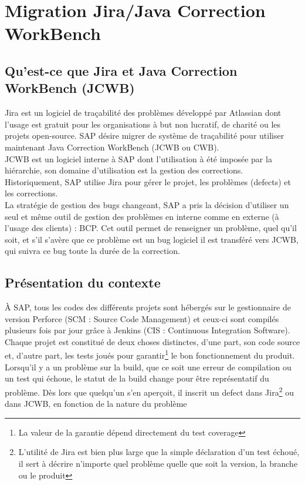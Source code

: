 \chapter{Migration Jira/Java Correction WorkBench}\label{chapitre:migration}

\section{Qu'est-ce que Jira et Java Correction WorkBench (JCWB)}
Jira est un logiciel de tra\c{c}abilit\'{e} des probl\`{e}mes d\'{e}veloppé par Atlassian dont l'usage est gratuit pour les organisations \`{a} but non lucratif, de charit\'{e} ou les projets open-source. SAP désire migrer de système de traçabilité pour utiliser maintenant Java Correction WorkBench (JCWB ou CWB).\\

JCWB est un logiciel interne à SAP dont l'utilisation à été imposée par la hiérarchie, son domaine d'utilisation est la gestion des corrections. Historiquement, SAP utilise Jira pour gérer le projet, les problèmes (defects) et les corrections.\\
La stratégie de gestion des bugs changeant, SAP a pris la décision d'utiliser un seul et même outil de gestion des problèmes en interne comme en externe (à l'usage des clients) : BCP. Cet outil permet de renseigner un problème, quel qu'il soit, et s'il s'avère que ce problème est un bug logiciel il est transféré vers JCWB, qui suivra ce bug toute la durée de la correction.




\section{Pr\'{e}sentation du contexte}


\`{A} SAP, tous les codes des différents projets sont hébergés sur le gestionnaire de version Perforce (SCM : Source Code Management)
et ceux-ci sont compilés plusieurs fois par jour grâce à Jenkins (CIS : Continuous Integration Software).\\
Chaque projet est constitué de deux choses distinctes, d'une part, son code source et, d'autre part, les tests joués pour garantir\footnote{La valeur de la garantie dépend directement du test coverage} le bon fonctionnement du produit. Lorsqu'il y a un problème sur la build, que ce soit une erreur de compilation ou un test qui échoue, le statut de la build change pour être représentatif du problème. Dès lors que quelqu'un s'en aperçoit, il inscrit un defect dans Jira\footnote{L'utilité de Jira est bien plus large que la simple déclaration d'un test échoué, il sert à décrire n'importe quel problème quelle que soit la version, la branche ou le produit} ou dans JCWB, en fonction de la nature du problème\\



